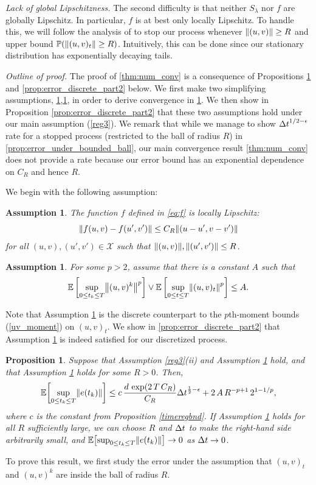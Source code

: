 \documentclass[11pt, twoside]{report}
\newtheorem{proposition}[theorem]{Proposition}
\newtheorem{assumption}[theorem]{Assumption}
\begin{document}
\textit{Lack of global Lipschitzness.}
The second difficulty is that  neither $S_\lambda$ nor $f$ are globally Lipschitz.  In particular, $f$ is at best only locally Lipschitz. To handle this, we will follow the analysis of \cite{higham2002strong} to stop our process whenever $\left\lVert(u,v)\right\rVert\geq R$ and upper bound $\mathbb{P}(\left\lVert(u,v)_t\right\rVert\geq R)$. Intuitively, this can be done since our stationary distribution has exponentially decaying tails. 

\textit{Outline of proof.}
The proof of \ref{thm:num_conv}  is a consequence of Propositions \ref{prop:error_discrete} and \ref{prop:error_discrete_part2} below. We first make two simplifying assumptions, \ref{ass:ball_R},\ref{ass:2}, in order to derive convergence in \ref{prop:error_discrete}. We then show in Proposition \ref{prop:error_discrete_part2} that these two assumptions hold under our main assumption (\ref{reg3}). 
 We remark that while we manage to show ${\Delta t}^{1/2-\epsilon}$ rate for a stopped process (restricted to the ball of radius $R$) in \ref{prop:error_under_bounded_ball}, our main convergence result \ref{thm:num_conv} does not provide a rate because our error bound has an exponential dependence on $C_R$ and hence $R$.

 We begin with the following assumption:
\begin{assumption}\label{ass:ball_R}
The function $f$ defined in \eqref{eq:f} is locally Lipschitz:
$$
\norm{f(u,v) - f(u',v')} \leq  C_R \norm{(u-u', v-v')}
$$
for all $(u,v),(u',v')\in \mathcal X$ such that $\norm{(u,v)}, \norm{(u',v')} \leq R$. 
\end{assumption}
%
\begin{assumption}\label{ass:2}   
For some $p>2$, assume that there is a constant $A$ such that
$$
\EE\left[\sup_{0\le t_k\leq T} \norm{(u,v)^k}^{p}\right] \vee \EE\left[\sup_{0\le t\leq T} \norm{(u,v)_t}^{p}\right] \leq A.
$$
\end{assumption}
Note that Assumption \ref{ass:2} is the discrete counterpart to the $p$th-moment bounds (\ref{uv_moment}) on $(u,v)_t$. We  show in \ref{prop:error_discrete_part2} that Assumption \ref{ass:2} is indeed satisfied for our discretized process.

\begin{proposition}\label{prop:error_discrete}
    Suppose that Assumption \ref{reg3}(ii) and Assumption \ref{ass:2} hold, and that Assumption \ref{ass:ball_R} holds for some $R>0$. Then, 
      $$
\EE\bp{ \sup_{0\leq t_k\leq T} \norm{e(t_k)} }\leq  c\,\frac{d \,\exp\pa{2\,T\, C_R}}{C_R}  \deltat^{\frac12-\epsilon} +  2\,A\, R^{-p+1}\, 2^{1-1/p},
$$
where $c$ is the constant from Proposition \ref{timeregbnd}.  If Assumption \ref{ass:ball_R} holds for all $R$ sufficiently large,  we can choose $R$ and ${\Delta t}$ to make the right-hand side arbitrarily small, and $\EE\bp{ \sup_{0\leq t_k\leq T} \norm{e(t_k)} }\to 0$ as ${\Delta t}\to 0$.
\end{proposition}
To prove this result, we first study the error under the assumption that $(u,v)_t$ and $(u,v)^k$ are inside the ball of radius $R$.
\end{document}
